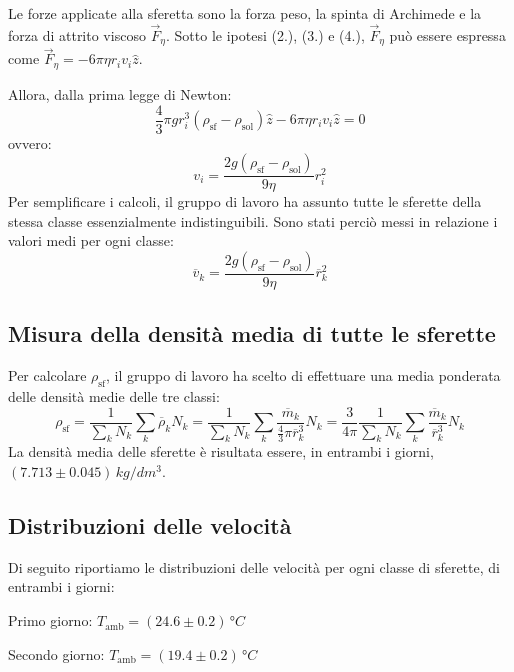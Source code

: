 \documentclass{article}
\begin{document}
\vspace{2mm}

Le forze applicate alla sferetta sono la forza peso, la spinta di Archimede
e la forza di attrito viscoso $\vec{F}_\eta$.
Sotto le ipotesi (2.), (3.) e (4.), $\vec{F}_\eta$ può essere espressa come
$\vec{F}_\eta = -6\pi\eta r_i v_i\hat{z}$.

Allora, dalla prima legge di Newton:
\[
  \frac{4}{3}\pi g r_i^3 (\rho_\text{sf} - \rho_\text{sol}) \hat{z}
  -6\pi\eta r_i v_i\hat{z} = 0
\]
ovvero:
\[
  v_i = \frac{2g(\rho_\text{sf} - \rho_\text{sol})}{9\eta} r_i^2
\]
Per semplificare i calcoli, il gruppo di lavoro ha assunto tutte le sferette
della stessa classe essenzialmente indistinguibili. Sono stati perciò messi
in relazione i valori medi per ogni classe: \[
  \overline{v}_k = \frac{2g(\rho_\text{sf} - \rho_\text{sol})}{9\eta}
  \overline{r}_k^2
\]

\vspace{2mm}

\subsection{Misura della densità media di tutte le sferette}
Per calcolare $\rho_\text{sf}$, il gruppo di lavoro ha scelto di
effettuare una media ponderata delle densità medie delle tre classi:
\[
  \rho_\text{sf} = \frac{1}{\sum_k N_k} \sum_k \overline{\rho}_k N_k
    = \frac{1}{\sum_k N_k} \sum_k \frac{\overline{m}_k}{
      \frac{4}{3}\pi \overline{r}_k^3} N_k
    = \frac{3}{4\pi} \frac{1}{\sum_k N_k} \sum_k \frac{\overline{m}_k}{
      \overline{r}_k^3} N_k
\]
La densità media delle sferette è risultata essere,
in entrambi i giorni, $(7.713\pm0.045)\,\unit{kg \per dm^3}$.

\pagebreak
\subsection{Distribuzioni delle velocità}
Di seguito riportiamo le distribuzioni delle velocità per ogni classe
di sferette, di entrambi i giorni:
\begin{center}
  Primo giorno: $T_\text{amb}=(24.6\pm0.2)\,\unit{\degree C}$

  Secondo giorno: $T_\text{amb}=(19.4\pm0.2)\,\unit{\degree C}$
\end{center}
\end{document}
